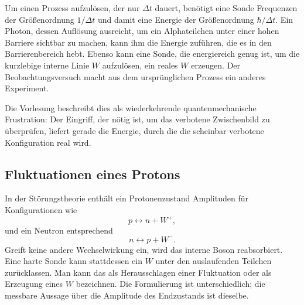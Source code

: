 Um einen Prozess aufzulösen, der nur \(\Delta t\) dauert, benötigt eine Sonde Frequenzen der Größenordnung \(1/\Delta t\) und damit eine Energie der Größenordnung \(\hbar/\Delta t\). Ein Photon, dessen Auflösung ausreicht, um ein Alphateilchen unter einer hohen Barriere sichtbar zu machen, kann ihm die Energie zuführen, die es in den Barrierenbereich hebt. Ebenso kann eine Sonde, die energiereich genug ist, um die kurzlebige interne Linie \(W\) aufzulösen, ein reales \(W\) erzeugen. Der Beobachtungsversuch macht aus dem ursprünglichen Prozess ein anderes Experiment.

Die Vorlesung beschreibt dies als wiederkehrende quantenmechanische Frustration: Der Eingriff, der nötig ist, um das verbotene Zwischenbild zu überprüfen, liefert gerade die Energie, durch die die scheinbar verbotene Konfiguration real wird.

\subsection{Fluktuationen eines Protons}

In der Störungstheorie enthält ein Protonenzustand Amplituden für Konfigurationen wie
\begin{equation}
  p\longleftrightarrow n+W^+,
\end{equation}
und ein Neutron entsprechend
\begin{equation}
  n\longleftrightarrow p+W^-.
\end{equation}
Greift keine andere Wechselwirkung ein, wird das interne Boson reabsorbiert. Eine harte Sonde kann stattdessen ein \(W\) unter den auslaufenden Teilchen zurücklassen. Man kann das als Herausschlagen einer Fluktuation oder als Erzeugung eines \(W\) bezeichnen. Die Formulierung ist unterschiedlich; die messbare Aussage über die Amplitude des Endzustands ist dieselbe.

\begin{classroomqa}\end{classroomqa}

